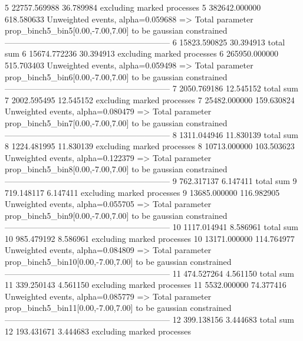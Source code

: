 5          22757.569988    36.789984       excluding marked processes    
5          382642.000000   618.580633      Unweighted events, alpha=0.059688
  => Total parameter prop_binch5_bin5[0.00,-7.00,7.00] to be gaussian constrained
------------------------------------------------------------
6          15823.590825    30.394913       total sum                     
6          15674.772236    30.394913       excluding marked processes    
6          265950.000000   515.703403      Unweighted events, alpha=0.059498
  => Total parameter prop_binch5_bin6[0.00,-7.00,7.00] to be gaussian constrained
------------------------------------------------------------
7          2050.769186     12.545152       total sum                     
7          2002.595495     12.545152       excluding marked processes    
7          25482.000000    159.630824      Unweighted events, alpha=0.080479
  => Total parameter prop_binch5_bin7[0.00,-7.00,7.00] to be gaussian constrained
------------------------------------------------------------
8          1311.044946     11.830139       total sum                     
8          1224.481995     11.830139       excluding marked processes    
8          10713.000000    103.503623      Unweighted events, alpha=0.122379
  => Total parameter prop_binch5_bin8[0.00,-7.00,7.00] to be gaussian constrained
------------------------------------------------------------
9          762.317137      6.147411        total sum                     
9          719.148117      6.147411        excluding marked processes    
9          13685.000000    116.982905      Unweighted events, alpha=0.055705
  => Total parameter prop_binch5_bin9[0.00,-7.00,7.00] to be gaussian constrained
------------------------------------------------------------
10         1117.014941     8.586961        total sum                     
10         985.479192      8.586961        excluding marked processes    
10         13171.000000    114.764977      Unweighted events, alpha=0.084809
  => Total parameter prop_binch5_bin10[0.00,-7.00,7.00] to be gaussian constrained
------------------------------------------------------------
11         474.527264      4.561150        total sum                     
11         339.250143      4.561150        excluding marked processes    
11         5532.000000     74.377416       Unweighted events, alpha=0.085779
  => Total parameter prop_binch5_bin11[0.00,-7.00,7.00] to be gaussian constrained
------------------------------------------------------------
12         399.138156      3.444683        total sum                     
12         193.431671      3.444683        excluding marked processes    
